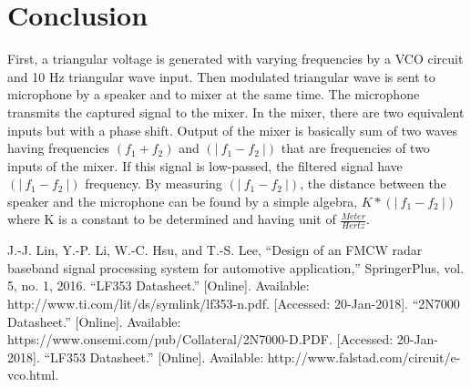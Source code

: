 \documentclass[paper]{IEEEtran}
\begin{document}
\vfill

\section{Conclusion}

	First, a triangular voltage is generated with varying frequencies by a VCO circuit and 10 Hz triangular wave input. Then modulated triangular wave is sent to microphone by a speaker and to mixer at the same time. The microphone transmits the captured signal to the mixer. In the mixer, there are two equivalent inputs but with a phase shift. Output of the mixer is basically sum of two waves having frequencies $ (f_1+f_2)$ and $(|~f_1 -f_2~|) $ that are frequencies of two inputs of the mixer. If this signal is low-passed, the filtered signal have $(|~f_1 -f_2~|) $ frequency. By measuring $(|~f_1 -f_2~|) $, the distance between the speaker and the microphone can be found by a simple algebra, $K*(|~f_1 -f_2~|) $ where K is a constant to be determined and having unit of $\frac{Meter}{Hertz} $.

 


\begin{thebibliography}{00}
 J.-J. Lin, Y.-P. Li, W.-C. Hsu, and T.-S. Lee, “Design of an FMCW radar baseband signal processing system for automotive application,” SpringerPlus, vol. 5, no. 1, 2016.	
 “LF353 Datasheet.” [Online]. Available: http://www.ti.com/lit/ds/symlink/lf353-n.pdf. [Accessed: 20-Jan-2018].
 “2N7000 Datasheet.” [Online]. Available: https://www.onsemi.com/pub/Collateral/2N7000-D.PDF. [Accessed: 20-Jan-2018].
 “LF353 Datasheet.” [Online]. Available: http://www.falstad.com/circuit/e-vco.html.

\end{thebibliography}
\end{document}
